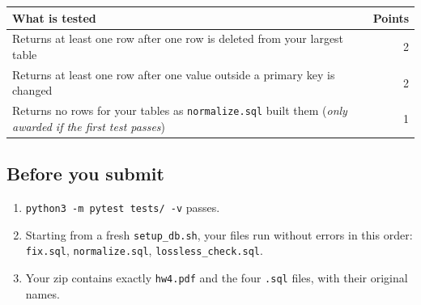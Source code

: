 \documentclass[11pt]{article}
\newcommand{\code}[1]{\texttt{#1}}
\begin{document}
\begin{center}
\small
\begin{tabularx}{\linewidth}{@{}X r@{}}
\toprule
\textbf{What is tested} & \textbf{Points}\\
\midrule
Returns at least one row after one row is deleted from your largest table & 2\\
Returns at least one row after one value outside a primary key is changed & 2\\
Returns no rows for your tables as \code{normalize.sql} built them (\emph{only awarded if the first test passes}) & 1\\
\bottomrule
\end{tabularx}
\end{center}

\subsection*{Before you submit}

\begin{enumerate}[nosep]
  \item \code{python3 -m pytest tests/ -v} passes.
  \item Starting from a fresh \code{setup\_db.sh}, your files run without
  errors in this order: \code{fix.sql}, \code{normalize.sql},
  \code{lossless\_check.sql}.
  \item Your zip contains exactly \code{hw4.pdf} and the four \code{.sql}
  files, with their original names.
\end{enumerate}
\end{document}
